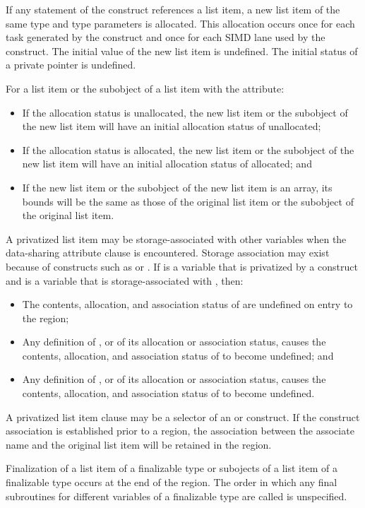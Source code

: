 \begin{fortranspecific}
If any statement of the construct references a list item, a new list
item of the same type and type parameters is allocated. This
allocation occurs once for each task generated by the construct and
once for each SIMD lane used by the construct. The initial value of
the new list item is undefined. The initial status of a private
pointer is undefined.

For a list item or the subobject of a list item with the  attribute:

\begin{itemize}
\item If the allocation status is unallocated, the new list item or the subobject
      of the new list item will have an initial allocation status of unallocated;
\item If the allocation status is allocated, the new list item or the subobject of
      the new list item will have an initial allocation status of allocated; and
\item If the new list item or the subobject of the new list item is an array, its 
      bounds will be the same as those of the original list item or the subobject 
      of the original list item.
\end{itemize}

A privatized list item may be storage-associated with other variables when the 
data-sharing attribute clause is encountered. Storage association may exist
because of constructs such as  or . If 
is a variable that is privatized by a construct and  is a variable that 
is storage-associated with , then:

\begin{itemize}
\item The contents, allocation, and association status of  are undefined 
      on entry to the region;
\item Any definition of , or of its allocation or association status, 
      causes the contents, allocation, and association status of  to 
      become undefined; and
\item Any definition of , or of its allocation or association status, 
      causes the contents, allocation, and association status of  to 
      become undefined.
\end{itemize}

A privatized list item clause may be a selector of an  or
 construct. If the construct association is established
prior to a  region, the association between the associate name
and the original list item will be retained in the region.

Finalization of a list item of a finalizable type or subojects of a
list item of a finalizable type occurs at the end of the region. The
order in which any final subroutines for different variables of a
finalizable type are called is unspecified.
\end{fortranspecific}

